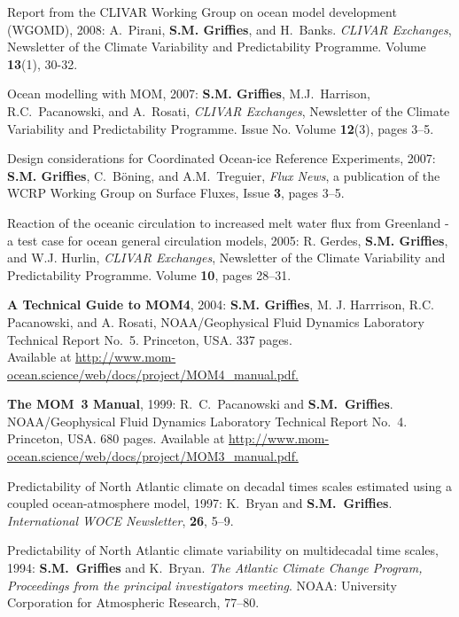 \begin{etaremune}
\item Report from the CLIVAR Working Group on ocean model development
  (WGOMD), 2008: A.\ Pirani, {\bf S.M. Grif\/f\/ies}, and H.\ Banks.
  {\em CLIVAR Exchanges}, Newsletter of the Climate Variability and
  Predictability Programme.  Volume {\bf 13}(1), 30-32.

\item Ocean modelling with MOM, 2007: {\bf S.M. Grif\/f\/ies}, M.J.\
  Harrison, R.C.\ Pacanowski, and A.\ Rosati, {\em CLIVAR Exchanges},
  Newsletter of the Climate Variability and Predictability Programme.
  Issue No. Volume {\bf 12}(3), pages 3--5.

\item Design considerations for Coordinated Ocean-ice Reference
  Experiments, 2007: {\bf S.M. Grif\/f\/ies}, C.\ B\"oning, and A.M.\
  Treguier, {\em Flux News}, a publication of the WCRP Working Group
  on Surface Fluxes, Issue {\bf 3}, pages 3--5.

\item Reaction of the oceanic circulation to increased melt water flux
  from Greenland - a test case for ocean general circulation models,
  2005: R. Gerdes, {\bf S.M. Grif\/f\/ies}, and W.J. Hurlin, {\em
    CLIVAR Exchanges}, Newsletter of the Climate Variability and
  Predictability Programme.  Volume {\bf 10}, pages 28--31.

\item {\bf A Technical Guide to MOM4}, 2004: {\bf S.M. Grif\/f\/ies},
M. J. Harrrison, R.C. Pacanowski, and A. Rosati, NOAA/Geophysical
Fluid Dynamics Laboratory Technical Report No.\ 5. Princeton, USA.
337 pages.  \\ Available at \href{http://www.mom-ocean.science/web/docs/project/MOM4_manual.pdf}{http://www.mom-ocean.science/web/docs/project/MOM4\_manual.pdf.}

\item {\bf The MOM~3 Manual}, 1999: R.\ C.\ Pacanowski and {\bf S.M.\
Grif\/f\/ies}.  NOAA/Geophysical Fluid Dynamics Laboratory Technical
Report No.\ 4. Princeton, USA.  680 pages.  Available at \href{http://www.mom-ocean.science/web/docs/project/MOM3_manual.pdf}{http://www.mom-ocean.science/web/docs/project/MOM3\_manual.pdf.}
  
\item Predictability of North Atlantic climate on decadal times scales
estimated using a coupled ocean-atmosphere model, 1997: K.\ Bryan and
{\bf S.M.\ Grif\/f\/ies}.  {\em International WOCE Newsletter}, {\bf
26}, 5--9.

\item Predictability of North Atlantic climate variability on multidecadal 
time scales, 1994: {\bf S.M.\ Grif\/f\/ies} and K.\ Bryan.  {\em The Atlantic Climate Change Program, Proceedings from the principal investigators meeting}.  NOAA: University Corporation for Atmospheric Research, 77--80.

\end{etaremune}


